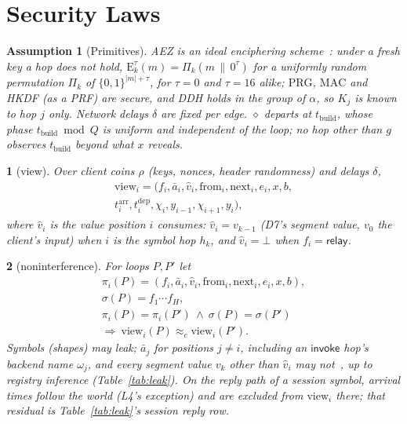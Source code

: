 \documentclass[journal]{IEEEtran}
\newtheorem{assumption}{Assumption}
\newcommand{\namedhead}{}
\newtheorem*{namedenv}{\namedhead}
\newenvironment{defD}[2]{\renewcommand{\namedhead}{Definition #1}%
  \begin{namedenv}[#2]}{\end{namedenv}}
\newenvironment{lawL}[2]{\renewcommand{\namedhead}{Law #1}%
  \begin{namedenv}[#2]}{\end{namedenv}}
\newcommand{\relay}{\mathsf{relay}}
\newcommand{\cl}{\diamond}
\newcommand{\Enc}[2]{\mathrm{E}^{#1}_{#2}}
\newcommand{\view}{\mathrm{view}}
\newcommand{\nxt}{\mathrm{next}}
\newcommand{\frm}{\mathrm{from}}
\newcommand{\arr}{t^{\mathrm{arr}}}
\newcommand{\dep}{t^{\mathrm{dep}}}
\newcommand{\eqc}{\approx_{c}}
\newcommand{\PRG}{\mathrm{PRG}}
\newcommand{\MAC}{\mathrm{MAC}}
\newcommand{\vh}[1]{\hat v_{#1}}
\begin{document}
\section{Security Laws}\label{sec:laws}

\begin{assumption}[Primitives]\label{as:prim}
AEZ is an ideal enciphering scheme~\cite{Hoang2015}: under a fresh key
a hop does not hold, $\Enc{\tau}{k}(m)=\Pi_k(m\,\|\,0^{\tau})$ for a
uniformly random permutation $\Pi_k$ of $\{0,1\}^{|m|+\tau}$, for
$\tau=0$ and $\tau=16$ alike; $\PRG$, $\MAC$ and HKDF (as a PRF) are
secure, and DDH holds in the group of $\alpha$, so $K_j$ is known to hop
$j$ only.  Network delays $\delta$ are fixed per edge.
$\cl$ departs at $t_{\mathrm{build}}$, whose phase
$t_{\mathrm{build}}\bmod Q$ is uniform and independent of the loop; no hop
other than $g$ observes $t_{\mathrm{build}}$ beyond what $x$ reveals.
\end{assumption}

\begin{defD}{D9}{view}
Over client coins $\rho$ (keys, nonces, header randomness) and delays
$\delta$,
\begin{multline*}
\view_i=(f_i,\bar a_i,\vh i,\frm_i,\nxt_i,e_i,x,b,\\
\arr_i,\dep_i,\chi_i,y_{i-1},\chi_{i+1},y_i),
\end{multline*}
where $\vh i$ is the value position $i$ consumes: $\vh i=v_{k-1}$ (D7's
segment value, $v_0$ the client's input) when $i$ is the symbol hop $h_k$,
and $\vh i=\bot$ when $f_i=\relay$.
\end{defD}

\begin{lawL}{L5}{noninterference}
For loops $P,P'$ let
\begin{gather*}
\pi_i(P)=(f_i,\bar a_i,\vh i,\frm_i,\nxt_i,e_i,x,b),\\
\sigma(P)=f_1\cdots f_H,\\
\pi_i(P)=\pi_i(P')\ \wedge\ \sigma(P)=\sigma(P')\\
\Rightarrow\ \view_i(P)\eqc\view_i(P') .
\end{gather*}
Symbols (shapes) may leak; $\bar a_j$ for positions $j\ne i$, including
an $\mathsf{invoke}$ hop's backend name $\omega_j$, and every segment
value $v_k$ other than $\vh i$ may not~\cite{Goguen1982}, up to registry
inference (Table~\ref{tab:leak}).  On the reply path of a session
symbol, arrival times follow the world (L4's exception) and are excluded
from $\view_i$ there; that residual is Table~\ref{tab:leak}'s session
reply row.
\end{lawL}
\end{document}
